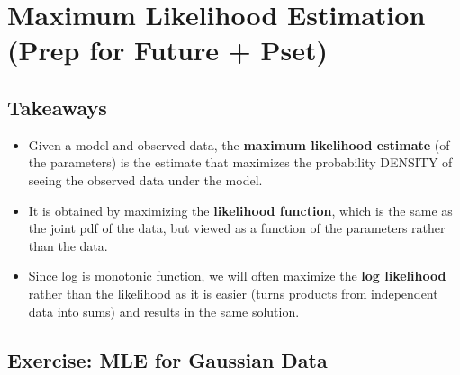 \documentclass[11pt,letterpaper]{article}
\begin{document}
\section{Maximum Likelihood Estimation (Prep for Future + Pset)}
\subsection{Takeaways}
\begin{itemize}
    \item Given a model and observed data, the \textbf{maximum likelihood estimate} (of the parameters) is the estimate that maximizes the probability DENSITY of seeing the observed data under the model.
    \item  It is obtained by maximizing the \textbf{likelihood function}, which is the same as the joint pdf of the data, but viewed as a function of the parameters rather than the data.
    \item Since log is monotonic function, we will often maximize the \textbf{log likelihood} rather than the likelihood as it is easier (turns products from independent data into sums) and results in the same solution.
\end{itemize}

\subsection{Exercise: MLE for Gaussian Data}
\vspace{80mm}





\end{document}
